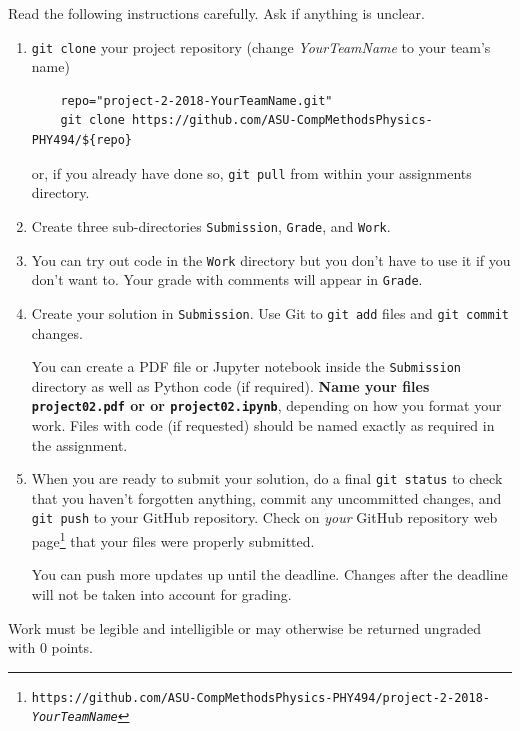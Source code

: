 \documentclass[letterpaper]{scrartcl}
\newcommand{\anumber}{2}
\newcommand{\anum}{0\anumber}
\begin{document}
\noindent
Read the following instructions carefully. Ask if anything is unclear.
\begin{enumerate}
\item \texttt{git clone} your project repository (change
  \emph{YourTeamName} to your team's name)
  \begin{verbatim}
    repo="project-2-2018-YourTeamName.git" 
    git clone https://github.com/ASU-CompMethodsPhysics-PHY494/${repo}
  \end{verbatim}
  or, if you already have done so, \texttt{git pull} from
  within your assignments directory.
\item  Create three sub-directories \texttt{Submission},
  \texttt{Grade}, and
  \texttt{Work}.
\item You can try out code in the \texttt{Work}
  directory but you don't have to use it if you don't want to. Your
  grade with comments will appear in
  \texttt{Grade}.
\item Create your solution in
  \texttt{Submission}. Use Git to \texttt{git
    add} files and \texttt{git commit} changes.

  You can create a PDF file or Jupyter notebook inside the
  \texttt{Submission} directory as well as Python
  code (if required). \textbf{Name your files \texttt{project\anum.pdf} or
    or \texttt{project\anum.ipynb}}, depending on how
  you format your work. Files with code (if requested) should be named
  exactly as required in the assignment.
\item When you are ready to submit your solution, do a final
  \texttt{git status} to check that you haven't forgotten anything,
  commit any uncommitted changes, and \texttt{git push} to your GitHub
  repository. Check on \emph{your} GitHub repository web
  page\footnote{\texttt{https://github.com/ASU-CompMethodsPhysics-PHY494/project-2-2018-\emph{YourTeamName}}}
  that your files were properly submitted.

  You can push more updates up until the deadline. Changes after the
  deadline will not be taken into account for grading.
\end{enumerate}
Work must be legible and intelligible or may otherwise be
returned ungraded with 0 points.
\end{document}
